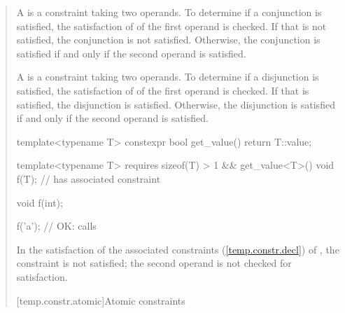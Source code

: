 \begin{quote}
\begin{addedblock}
\pnum
A  is a constraint taking two 
operands. 
% 
To determine if a conjunction is satisfied, the satisfaction of
of the first operand is checked. If that is not satisfied, the conjunction is not
satisfied. Otherwise, the conjunction is satisfied if and only if the second
operand is satisfied.


\pnum
A  is a constraint taking two 
operands. 
% 
To determine if a disjunction is satisfied, the satisfaction of
of the first operand is checked. If that is satisfied, the disjunction is
satisfied. Otherwise, the disjunction is satisfied if and only if the second
operand is satisfied.

\pnum
\enterexample
\begin{codeblock}
template<typename T>
  constexpr bool get_value() { return T::value; }

template<typename T>
  requires sizeof(T) > 1 && get_value<T>()
    void f(T);   // has associated constraint 

void f(int);

f('a'); // OK: calls 
\end{codeblock}
In the satisfaction of the associated constraints (\ref{temp.constr.decl}) 
of , the constraint  is not satisfied; 
the second operand is not checked for satisfaction.
\exitexample


[temp.constr.atomic]{Atomic constraints}


\end{addedblock}
\end{quote}
